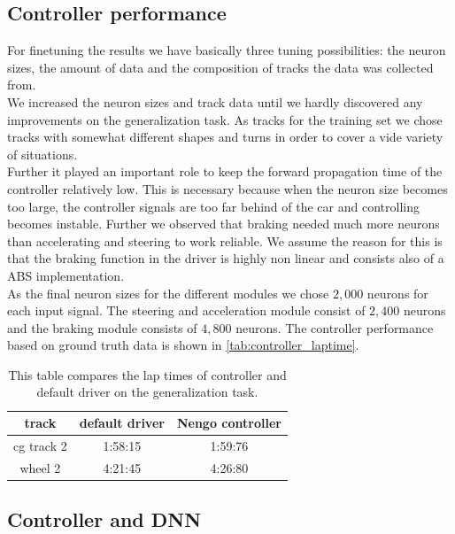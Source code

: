 \documentclass[10pt,a4paper,twoside,journal]{IEEEtran}
\begin{document}
\subsection{Controller performance}
For finetuning the results we have basically three tuning possibilities: the neuron sizes, the amount of data and the composition of tracks the data was collected from. \\
We increased the neuron sizes and track data until we hardly discovered any improvements on the generalization task. As tracks for the training set we chose tracks with somewhat different shapes and turns in order to cover a vide variety of situations. \\
Further it played an important role to keep the forward propagation time of the controller relatively low. This is necessary because when the neuron size becomes too large, the controller signals are too far behind of the car and controlling becomes instable. Further we observed that braking needed much more neurons than accelerating and steering to work reliable. We assume the reason for this is that the braking function in the driver is highly non linear and consists also of a ABS implementation. \\
As the final neuron sizes for the different modules we chose $2,000$ neurons for each input signal. The steering and acceleration module consist of $2,400$ neurons and the braking module consists of $4,800$ neurons. The controller performance based on ground truth data is shown in \autoref{tab:controller_laptime}.

\begin{table}[ht]
	\begin{center}
		\begin{tabular}{ |c|c|c| } 
			\hline
			track &  default driver & Nengo controller\\
			\hline
			cg track 2  & 1:58:15 & 1:59:76  \\
			wheel 2 & 4:21:45 & 4:26:80 \\
			\hline
		\end{tabular}
		\caption{\label{tab:controller_laptime}This table compares the lap times of controller and default driver on the generalization task.}
	\end{center}
\end{table}


\subsection{Controller and DNN}
\end{document}
